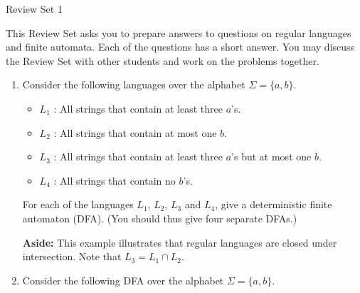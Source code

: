 \documentclass[12pt]{article}
\begin{document}
\begin{center}
{\large Review Set 1} 
\end{center}

This Review Set asks you to prepare answers to questions on regular
languages and finite automata. Each of the questions has a short answer.
You may discuss the Review Set with other students and work on the problems
together. 

\begin{enumerate} 

\item 
Consider the following languages over the alphabet $\Sigma = \{a,b\}$. 
\begin{itemize}
\item $L_1$ : All strings that contain at least three $a$'s. 
\item $L_2$ : All strings that contain at most one $b$. 
\item $L_3$ : All strings that contain at least three $a$'s but at most one
$b$. 
\item $L_4$ : All strings that contain no $b$'s. 
\end{itemize} 
For each of the languages $L_1$, $L_2$, $L_3$ and $L_4$, give a
deterministic finite automaton (DFA). (You should thus give four separate
DFAs.) 

{\bf Aside:} This example illustrates that regular languages are closed
under intersection. Note that $L_3 = L_1 \cap L_2$.

\item

Consider the following DFA over the alphabet $\Sigma = \{a,b\}$. 

\begin{center}
\end{center}


\end{enumerate}
\end{document}
